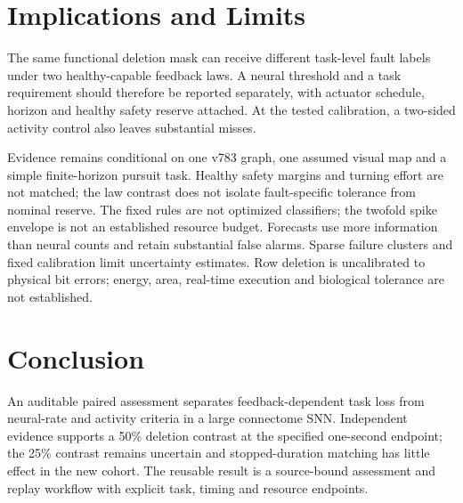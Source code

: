 \section{Implications and Limits}
The same functional deletion mask can receive different task-level fault labels under two healthy-capable feedback laws. A neural threshold and a task requirement should therefore be reported separately, with actuator schedule, horizon and healthy safety reserve attached. At the tested calibration, a two-sided activity control also leaves substantial misses.

Evidence remains conditional on one v783 graph, one assumed visual map and a simple finite-horizon pursuit task. Healthy safety margins and turning effort are not matched; the law contrast does not isolate fault-specific tolerance from nominal reserve. The fixed rules are not optimized classifiers; the twofold spike envelope is not an established resource budget. Forecasts use more information than neural counts and retain substantial false alarms. Sparse failure clusters and fixed calibration limit uncertainty estimates. Row deletion is uncalibrated to physical bit errors; energy, area, real-time execution and biological tolerance are not established.

\section{Conclusion}
An auditable paired assessment separates feedback-dependent task loss from neural-rate and activity criteria in a large connectome SNN. Independent evidence supports a 50\% deletion contrast at the specified one-second endpoint; the 25\% contrast remains uncertain and stopped-duration matching has little effect in the new cohort. The reusable result is a source-bound assessment and replay workflow with explicit task, timing and resource endpoints.
